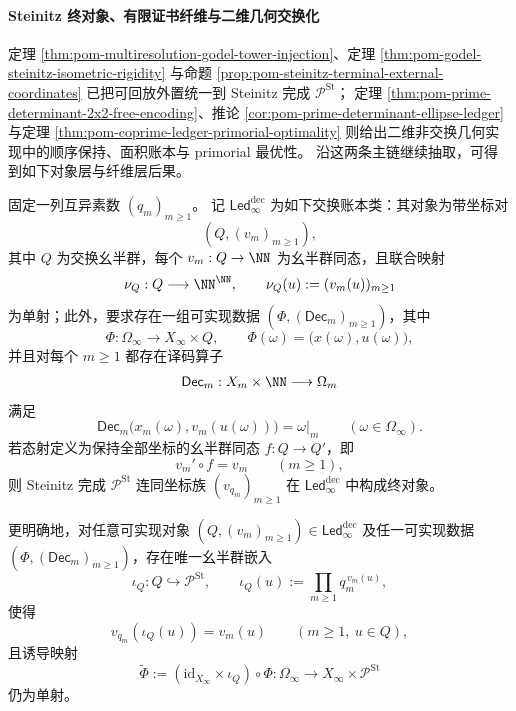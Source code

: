 \paragraph{Steinitz 终对象、有限证书纤维与二维几何交换化}
定理 \ref{thm:pom-multiresolution-godel-tower-injection}、定理 \ref{thm:pom-godel-steinitz-isometric-rigidity} 与命题 \ref{prop:pom-steinitz-terminal-external-coordinates} 已把可回放外置统一到 Steinitz 完成 \(\mathcal P^{\mathrm{St}}\)；
定理 \ref{thm:pom-prime-determinant-2x2-free-encoding}、推论 \ref{cor:pom-prime-determinant-ellipse-ledger} 与定理 \ref{thm:pom-coprime-ledger-primorial-optimality} 则给出二维非交换几何实现中的顺序保持、面积账本与 primorial 最优性。
沿这两条主链继续抽取，可得到如下对象层与纤维层后果。

\begin{theorem}\label{thm:pom-steinitz-terminal-object-prefix-decodable-ledger}
固定一列互异素数 \((q_m)_{m\ge 1}\)。
记 \(\mathsf{Led}^{\mathrm{dec}}_\infty\) 为如下交换账本类：其对象为带坐标对
\[
(Q,(v_m)_{m\ge 1}),
\]
其中 \(Q\) 为交换幺半群，每个 \(v_m:Q\to\NN\) 为幺半群同态，且联合映射
\[
\nu_Q:Q\longrightarrow \NN^{\NN},
\qquad
\nu_Q(u):=(v_m(u))_{m\ge 1}
\]
为单射；此外，要求存在一组可实现数据 \((\Phi,(\mathsf{Dec}_m)_{m\ge 1})\)，其中
\[
\Phi:\Omega_\infty\longrightarrow X_\infty\times Q,
\qquad
\Phi(\omega)=\bigl(x(\omega),u(\omega)\bigr),
\]
并且对每个 \(m\ge 1\) 都存在译码算子
\[
\mathsf{Dec}_m:X_m\times\NN\longrightarrow \Omega_m
\]
满足
\[
\mathsf{Dec}_m\bigl(x_m(\omega),v_m(u(\omega))\bigr)=\omega|_m
\qquad
(\omega\in\Omega_\infty).
\]
若态射定义为保持全部坐标的幺半群同态 \(f:Q\to Q'\)，即
\[
v_m'\circ f=v_m
\qquad (m\ge 1),
\]
则 Steinitz 完成 \(\mathcal P^{\mathrm{St}}\) 连同坐标族 \((v_{q_m})_{m\ge 1}\) 在 \(\mathsf{Led}^{\mathrm{dec}}_\infty\) 中构成终对象。

更明确地，对任意可实现对象 \((Q,(v_m)_{m\ge 1})\in \mathsf{Led}^{\mathrm{dec}}_\infty\) 及任一可实现数据 \((\Phi,(\mathsf{Dec}_m)_{m\ge 1})\)，存在唯一幺半群嵌入
\[
\iota_Q:Q\hookrightarrow \mathcal P^{\mathrm{St}},
\qquad
\iota_Q(u):=\prod_{m\ge 1} q_m^{\,v_m(u)},
\]
使得
\[
v_{q_m}(\iota_Q(u))=v_m(u)
\qquad
(m\ge 1,\ u\in Q),
\]
且诱导映射
\[
\widetilde\Phi:=(\mathrm{id}_{X_\infty}\times \iota_Q)\circ \Phi:
\Omega_\infty\longrightarrow X_\infty\times \mathcal P^{\mathrm{St}}
\]
仍为单射。
\end{theorem}
